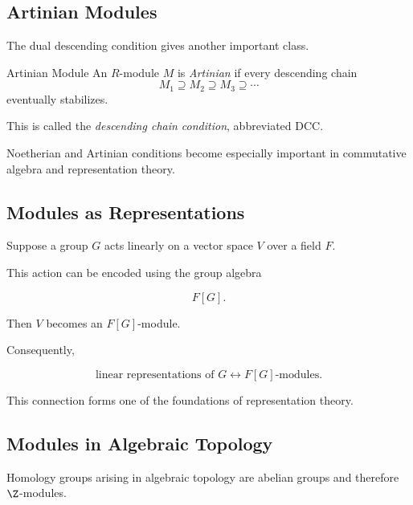 \subsection{Artinian Modules}
\label{subsec:artinian-modules}

The dual descending condition gives another important class.

\begin{definitionbox}{Artinian Module}
An \(R\)-module \(M\) is \emph{Artinian} if every descending chain
\[ M_1\supseteq M_2\supseteq M_3\supseteq\cdots \]
eventually stabilizes.
\end{definitionbox}

This is called the \emph{descending chain condition}, abbreviated DCC.

Noetherian and Artinian conditions become especially important in
commutative algebra and representation theory.

\subsection{Modules as Representations}
\label{subsec:modules-as-representations}

Suppose a group \(G\) acts linearly on a vector space \(V\) over a field
\(F\).

This action can be encoded using the group algebra

\[ F[G]. \]

Then \(V\) becomes an \(F[G]\)-module.

Consequently,

\[
\boxed{
\text{linear representations of }G
\longleftrightarrow
F[G]\text{-modules}.
}
\]

This connection forms one of the foundations of representation theory.

\subsection{Modules in Algebraic Topology}
\label{subsec:modules-algebraic-topology}

Homology groups arising in algebraic topology are abelian groups and
therefore \(\Z\)-modules.

